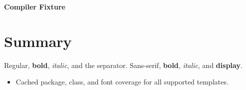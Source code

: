 \documentclass[10pt,a4paper]{article}
\begin{document}
\fontsize{9.3}{10.8}\selectfont
{\LARGE\bfseries Compiler Fixture}
\section{Summary}
Regular, \textbf{bold}, \textit{italic}, and the \textbar{} separator.
{\sffamily Sans-serif, \textbf{bold}, \textit{italic}, and
\fontsize{28}{32}\selectfont\textbf{display}.}
{\fontsize{9.3}{10.8}\selectfont\textbullet}
\begin{itemize}
  \item Cached package, class, and font coverage for all supported templates.
\end{itemize}
\end{document}
